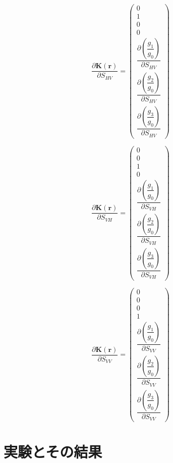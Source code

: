 \documentclass[12pt,a4paper]{jsreport}
\begin{document}
  \begin{equation}
    \frac{\partial \bm{K({\bm{r}})}}{\partial S_{HV}} 
    = \begin{pmatrix} 0 \\ 1 \\ 0 \\ 0 \\  \dfrac{\partial (\dfrac{g_{1}}{g_{0}})}{\partial S_{HV}}  \\  \dfrac{\partial (\dfrac{g_{2}}{g_{0}})}{\partial S_{HV}} \\  \dfrac{\partial (\dfrac{g_{3}}{g_{0}})}{\partial S_{HV}} \end{pmatrix}
    \label{polarimetricdiffSHV}
    \end{equation}
  
  
    \begin{equation}
      \frac{\partial \bm{K({\bm{r}})}}{\partial S_{VH}} 
      = \begin{pmatrix} 0 \\ 0 \\ 1 \\ 0 \\  \dfrac{\partial (\dfrac{g_{1}}{g_{0}})}{\partial S_{VH}}  \\  \dfrac{\partial (\dfrac{g_{2}}{g_{0}})}{\partial S_{VH}} \\  \dfrac{\partial (\dfrac{g_{3}}{g_{0}})}{\partial S_{VH}} \end{pmatrix}
      \label{polarimetricdiffSVH}
      \end{equation}
  
    \begin{equation}
      \frac{\partial \bm{K({\bm{r}})}}{\partial S_{VV}} 
      = \begin{pmatrix} 0 \\ 0 \\ 0 \\ 1 \\  \dfrac{\partial (\dfrac{g_{1}}{g_{0}})}{\partial S_{VV}}  \\  \dfrac{\partial (\dfrac{g_{2}}{g_{0}})}{\partial S_{VV}} \\  \dfrac{\partial (\dfrac{g_{3}}{g_{0}})}{\partial S_{VV}} \end{pmatrix}
      \label{polarimetricdiffSVV}
      \end{equation}


\chapter{実験とその結果}
\end{document}
